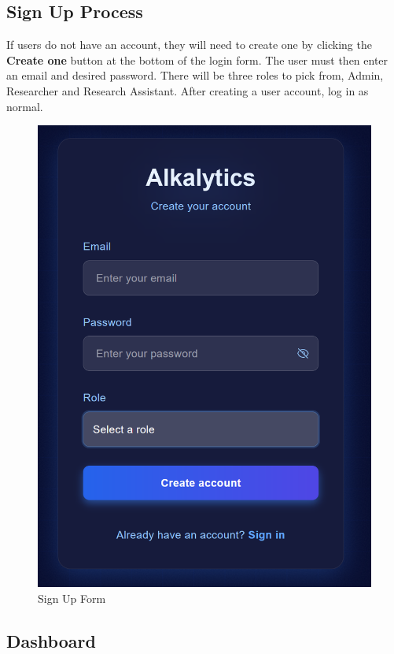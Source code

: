 \documentclass[12pt]{article}
\begin{document}
\subsection{Sign Up Process}
If users do not have an account, they will need to create one by clicking the
\textbf{Create one} button at the bottom of the login form. The user must then
enter an email and desired password. There will be three roles to pick from,
Admin, Researcher and Research Assistant. After creating a user account, log in
as normal. 
\begin{figure}[H]
    \centering
    \includegraphics[scale=0.55]{./Diagrams/sign up .png}
    \caption{Sign Up Form}
    \label{fig:example}
\end{figure}

\subsection{Dashboard}
\end{document}
